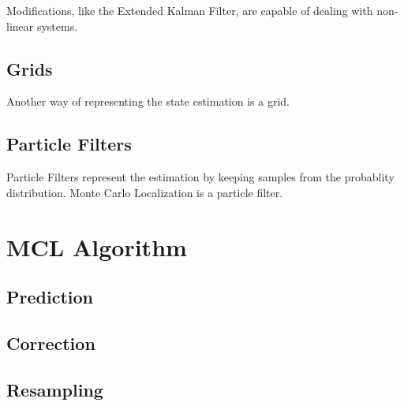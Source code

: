 Modifications, like the Extended Kalman Filter, are capable of dealing with
non-linear systems.

\subsection{Grids}
Another way of representing the state estimation is a grid.

\subsection{Particle Filters}
Particle Filters represent the estimation by keeping samples from the
probablity distribution.
Monte Carlo Localization is a particle filter.

\section{MCL Algorithm}

\cite{dellaert99}

\subsection{Prediction}
\subsection{Correction}
\subsection{Resampling}
